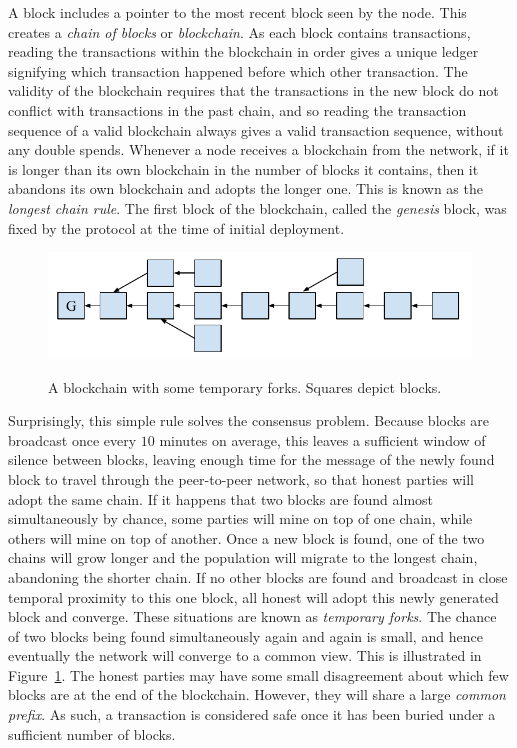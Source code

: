 A block includes a pointer to the most recent block seen by the node. This
creates a \emph{chain of blocks} or \emph{blockchain}. As each block contains
transactions, reading the transactions within the blockchain in order gives a
unique ledger signifying which transaction happened before which other
transaction. The validity of the blockchain requires that the transactions in
the new block do not conflict with transactions in the past chain, and so
reading the transaction sequence of a valid blockchain always gives a valid
transaction sequence, without any double spends. Whenever a node receives a blockchain from the
network, if it is longer than its own blockchain in the number of blocks it
contains, then it abandons its own blockchain and adopts the longer one. This is
known as the \emph{longest chain rule}. The first block of the blockchain,
called the \emph{genesis} block, was fixed by the protocol at the time of
initial deployment.

\begin{figure}[h]
    \caption{
    A blockchain with some temporary forks. Squares depict blocks.
    }
    \centering
    \includegraphics[width=0.7\columnwidth,keepaspectratio]{chapters/introduction/figures/blockchain.pdf}
    \label{fig.blockchain}
\end{figure}

Surprisingly, this simple rule solves the consensus problem. Because blocks are
broadcast once every $10$ minutes on average, this leaves a sufficient window of
silence between blocks, leaving enough time for the message of the newly found
block to travel through the peer-to-peer network, so that honest parties will adopt the same chain. If it
happens that two blocks are found almost simultaneously by chance, some parties
will mine on top of one chain, while others will mine on top of another. Once a
new block is found, one of the two chains will grow longer and the population
will migrate to the longest chain, abandoning the shorter chain. If no other
blocks are found and broadcast in close temporal proximity to this one block,
all honest will adopt this newly generated block and converge.
These situations are known as \emph{temporary forks}. The
chance of two blocks being found simultaneously again and again is small, and
hence eventually the network will converge to a common view. This is illustrated
in Figure~\ref{fig.blockchain}. The honest parties may have some small
disagreement about which few blocks are at the end of the blockchain. However,
they will share a large \emph{common prefix}. As such, a transaction is
considered safe once it has been buried under a sufficient number of blocks.

